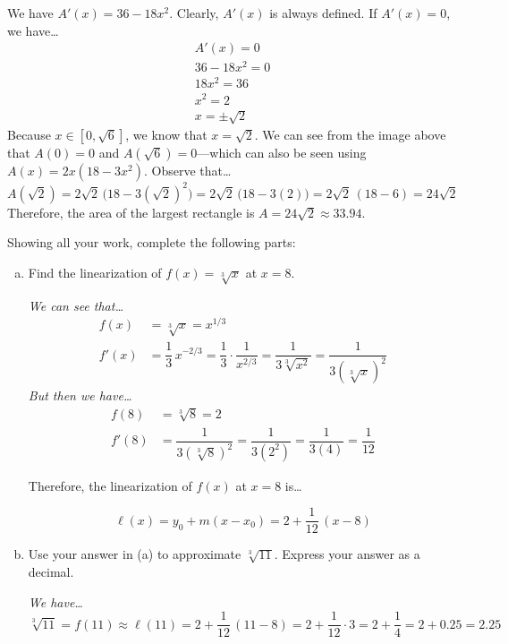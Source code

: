 \documentclass[12pt,letterpaper]{exam}
\begin{document}
\begin{questions}
{We have $A'(x)= 36 - 18x^2$. Clearly, $A'(x)$ is always defined. If $A'(x)= 0$, we have\dots
	\[
	\begin{gathered}
	A'(x)= 0 \\
	36 - 18x^2= 0 \\
	18x^2= 36 \\
	x^2= 2 \\
	x= \pm \sqrt{2}
	\end{gathered}
	\]
Because $x \in [0, \sqrt{6}]$, we know that $x= \sqrt{2}$. We can see from the image above that $A(0)= 0$ and $A(\sqrt{6})= 0$---which can also be seen using $A(x)= 2x(18 - 3x^2)$. Observe that\dots
	\[
	A(\sqrt{2})= 2 \sqrt{2} \, \big(18 - 3 (\sqrt{2})^2 \big)= 2 \sqrt{2} \,\big(18 - 3(2) \big)= 2 \sqrt{2} \,(18 - 6)= 24 \sqrt{2}
	\]
Therefore, the area of the largest rectangle is $A= 24 \sqrt{2} \approx 33.94$.
}



\newpage
\question[16] Showing all your work, complete the following parts:
	\begin{enumerate}[(a)]
	\item Find the linearization of $f(x)= \sqrt[3]{x}$ at $x= 8$. \pspace
	
	{\itshape We can see that\dots
		\[
		\begin{aligned}
		f(x)&= \sqrt[3]{x}= x^{1/3} \\[0.3cm]
		f'(x)&= \dfrac{1}{3}\, x^{-2/3}= \dfrac{1}{3} \cdot \dfrac{1}{x^{2/3}}= \dfrac{1}{3 \sqrt[3]{x^2}}= \dfrac{1}{3 (\sqrt[3]{x})^2}
		\end{aligned}
		\]
	But then we have\dots
		\[
		\begin{aligned}
		f(8)&=\sqrt[3]{8}= 2 \\[0.3cm]
		f'(8)&= \dfrac{1}{3(\sqrt[3]{8})^2}= \dfrac{1}{3(2^2)}= \dfrac{1}{3(4)}= \dfrac{1}{12}
		\end{aligned}
		\] \par\vspace{0.5cm}
	Therefore, the linearization of $f(x)$ at $x= 8$ is\dots \par\vspace{0.1cm}
		\[
		\ell(x)= y_0 + m(x - x_0)= 2 + \dfrac{1}{12} \, (x - 8) 
		\]
	} \par\vspace{2.6cm}
	
	\item Use your answer in (a) to approximate $\sqrt[3]{11}$. Express your answer as a decimal. \pspace
	
	{\itshape We have\dots
		\[
		\sqrt[3]{11}= f(11) \approx \ell(11)= 2 + \dfrac{1}{12} \,(11 - 8)= 2 + \dfrac{1}{12} \cdot 3= 2 + \dfrac{1}{4}= 2 + 0.25= 2.25
		\]
	} \vfill
	

\end{enumerate}
\end{questions}
\end{document}
